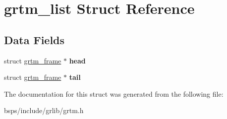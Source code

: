 \hypertarget{structgrtm__list}{}\section{grtm\+\_\+list Struct Reference}
\label{structgrtm__list}
\subsection*{Data Fields}
\begin{DoxyCompactItemize}
\item 
\mbox{\label{structgrtm__list_a4e2fd863436f3a4056d00d52591daf8a}} 
struct \mbox{\hyperlink{structgrtm__frame}{grtm\+\_\+frame}} $\ast$ {\bfseries head}
\item 
\mbox{\label{structgrtm__list_a2387b0de359a06ffe9092e7612a6230e}} 
struct \mbox{\hyperlink{structgrtm__frame}{grtm\+\_\+frame}} $\ast$ {\bfseries tail}
\end{DoxyCompactItemize}


The documentation for this struct was generated from the following file\+:\begin{DoxyCompactItemize}
\item 
bsps/include/grlib/grtm.\+h\end{DoxyCompactItemize}
